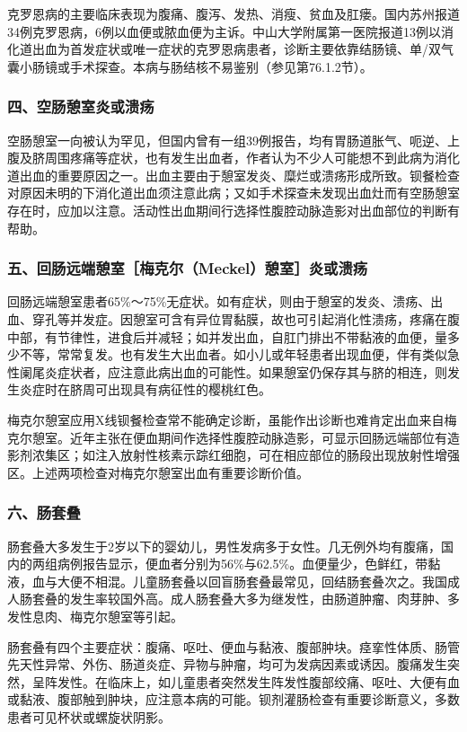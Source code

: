 克罗恩病的主要临床表现为腹痛、腹泻、发热、消瘦、贫血及肛瘘。国内苏州报道34例克罗恩病，6例以血便或脓血便为主诉。中山大学附属第一医院报道13例以消化道出血为首发症状或唯一症状的克罗恩病患者，诊断主要依靠结肠镜、单/双气囊小肠镜或手术探查。本病与肠结核不易鉴别（参见第76.1.2节）。

\subsubsection{四、空肠憩室炎或溃疡}

空肠憩室一向被认为罕见，但国内曾有一组39例报告，均有胃肠道胀气、呃逆、上腹及脐周围疼痛等症状，也有发生出血者，作者认为不少人可能想不到此病为消化道出血的重要原因之一。出血主要由于憩室发炎、糜烂或溃疡形成所致。钡餐检查对原因未明的下消化道出血须注意此病；又如手术探查未发现出血灶而有空肠憩室存在时，应加以注意。活动性出血期间行选择性腹腔动脉造影对出血部位的判断有帮助。

\subsubsection{五、回肠远端憩室［梅克尔（Meckel）憩室］炎或溃疡}

回肠远端憩室患者65\%～75\%无症状。如有症状，则由于憩室的发炎、溃疡、出血、穿孔等并发症。因憩室可含有异位胃黏膜，故也可引起消化性溃疡，疼痛在腹中部，有节律性，进食后并减轻；如并发出血，自肛门排出不带黏液的血便，量多少不等，常常复发。也有发生大出血者。如小儿或年轻患者出现血便，伴有类似急性阑尾炎症状者，应注意此病出血的可能性。如果憩室仍保存其与脐的相连，则发生炎症时在脐周可出现具有病征性的樱桃红色。

梅克尔憩室应用X线钡餐检查常不能确定诊断，虽能作出诊断也难肯定出血来自梅克尔憩室。近年主张在便血期间作选择性腹腔动脉造影，可显示回肠远端部位有造影剂浓集区；如注入放射性核素示踪红细胞，可在相应部位的肠段出现放射性增强区。上述两项检查对梅克尔憩室出血有重要诊断价值。

\subsubsection{六、肠套叠}

肠套叠大多发生于2岁以下的婴幼儿，男性发病多于女性。几无例外均有腹痛，国内的两组病例报告显示，便血者分别为56\%与62.5\%。血便量少，色鲜红，带黏液，血与大便不相混。儿童肠套叠以回盲肠套叠最常见，回结肠套叠次之。我国成人肠套叠的发生率较国外高。成人肠套叠大多为继发性，由肠道肿瘤、肉芽肿、多发性息肉、梅克尔憩室等引起。

肠套叠有四个主要症状：腹痛、呕吐、便血与黏液、腹部肿块。痉挛性体质、肠管先天性异常、外伤、肠道炎症、异物与肿瘤，均可为发病因素或诱因。腹痛发生突然，呈阵发性。在临床上，如儿童患者突然发生阵发性腹部绞痛、呕吐、大便有血或黏液、腹部触到肿块，应注意本病的可能。钡剂灌肠检查有重要诊断意义，多数患者可见杯状或螺旋状阴影。

